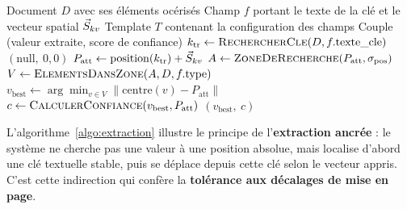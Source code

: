 \begin{algorithm}[H]
\caption{Extraction d'un champ à partir de sa clé}
\label{algo:extraction}
\begin{opalgbox}
\opalgfont
\begin{algorithmic}[1]
\Require Document $D$ avec ses éléments océrisés
\Require Champ $f$ portant le texte de la clé et le vecteur spatial $\vec{S}_{kv}$
\Require Template $T$ contenant la configuration des champs
\Ensure Couple (valeur extraite, score de confiance)
  \State $k_{\text{tr}} \gets \Call{RechercherCle}{D, f.\text{texte\_cle}}$ 
    \State \Return $(\text{null},\ 0{,}0)$ 
  \EndIf
  \State $P_{\text{att}} \gets \mathrm{position}(k_{\text{tr}}) + \vec{S}_{kv}$ 
  \State $A \gets \Call{ZoneDeRecherche}{P_{\text{att}}, \sigma_{\text{pos}}}$ 
  \State $V \gets \Call{ElementsDansZone}{A, D, f.\text{type}}$ 
  \State $v_{\text{best}} \gets \arg\min_{v \in V} \lVert \mathrm{centre}(v) - P_{\text{att}} \rVert$ 
  \State $c \gets \Call{CalculerConfiance}{v_{\text{best}}, P_{\text{att}}}$ 
  \State \Return $(v_{\text{best}},\ c)$
\EndProcedure
\end{algorithmic}
\end{opalgbox}
\end{algorithm}

L'algorithme~\ref{algo:extraction} illustre le principe de l'\textbf{extraction ancrée} : le
système ne cherche pas une valeur à une position absolue, mais localise d'abord une clé
textuelle stable, puis se déplace depuis cette clé selon le vecteur appris. C'est cette
indirection qui confère la \textbf{tolérance aux décalages de mise en page}.

